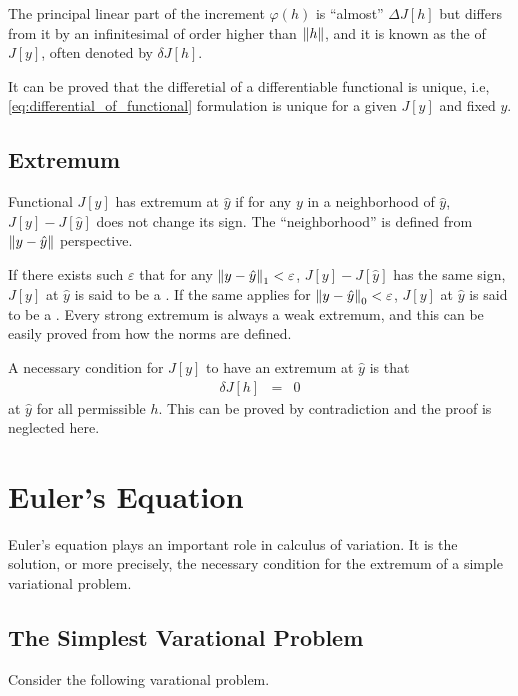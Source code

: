 The principal linear part of the increment $\varphi(h)$ is ``almost'' $\Delta J[h]$ but differs from it by an infinitesimal of order higher than $\left\lVert h\right\rVert$, and it is known as the  of $J[y]$, often denoted by $\delta J[h]$.

It can be proved that the differetial of a differentiable functional is unique, i.e, \eqref{eq:differential_of_functional} formulation is unique for a given $J[y]$ and fixed $y$.

\subsection{Extremum} \label{sec:functional_extremum}

Functional $J[y]$ has extremum at $\hat{y}$ if for any $y$ in a neighborhood of $\hat{y}$, $J[y]-J\left[\hat{y}\right]$ does not change its sign. The ``neighborhood'' is defined from $\left\lVert y-\hat{y}\right\rVert$ perspective.

If there exists such $\varepsilon$ that for any $\left\lVert y-\hat{y}\right\rVert_1 < \varepsilon$, $J[y]-J\left[\hat{y}\right]$ has the same sign, $J[y]$ at $\hat{y}$ is said to be a . If the same applies for $\left\lVert y-\hat{y}\right\rVert_0 < \varepsilon$, $J[y]$ at $\hat{y}$ is said to be a . Every strong extremum is always a weak extremum, and this can be easily proved from how the norms are defined.

A necessary condition for $J[y]$ to have an extremum at $\hat{y}$ is that
\begin{eqnarray}
\delta J[h] &=& 0 \label{eq:functional_extremum_necessary_condition}
\end{eqnarray}
at $\hat{y}$ for all permissible $h$. This can be proved by contradiction and the proof is neglected here.

\section{Euler's Equation}

Euler's equation plays an important role in calculus of variation. It is the solution, or more precisely, the necessary condition for the extremum of a simple variational problem.

\subsection{The Simplest Varational Problem}

Consider the following varational problem.

